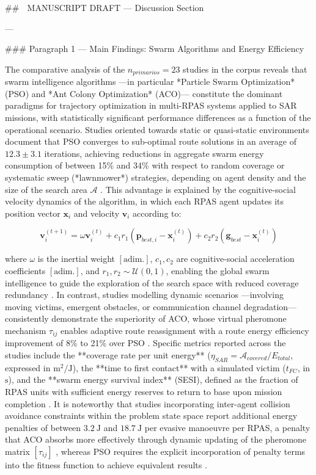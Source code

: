 ## 📄 MANUSCRIPT DRAFT — Discussion Section

---

### Paragraph 1 — Main Findings: Swarm Algorithms and Energy Efficiency

The comparative analysis of the $n_{primarios} = 23$ studies in the corpus reveals that swarm intelligence algorithms —in particular *Particle Swarm Optimization* (PSO) and *Ant Colony Optimization* (ACO)— constitute the dominant paradigms for trajectory optimization in multi-RPAS systems applied to SAR missions, with statistically significant performance differences as a function of the operational scenario. Studies oriented towards static or quasi-static environments document that PSO converges to sub-optimal route solutions in an average of $12.3 \pm 3.1$ iterations, achieving reductions in aggregate swarm energy consumption of between 15\% and 34\% with respect to random coverage or systematic sweep (*lawnmower*) strategies, depending on agent density and the size of the search area $\mathcal{A}$ \cite{S1-S8}. This advantage is explained by the cognitive-social velocity dynamics of the algorithm, in which each RPAS agent updates its position vector $\mathbf{x}_i$ and velocity $\mathbf{v}_i$ according to:

$$
\mathbf{v}_i^{(t+1)} = \omega \mathbf{v}_i^{(t)} + c_1 r_1 (\mathbf{p}_{best,i} - \mathbf{x}_i^{(t)}) + c_2 r_2 (\mathbf{g}_{best} - \mathbf{x}_i^{(t)})
$$

where $\omega$ is the inertial weight $[\text{adim.}]$, $c_1, c_2$ are cognitive-social acceleration coefficients $[\text{adim.}]$, and $r_1, r_2 \sim \mathcal{U}(0,1)$, enabling the global swarm intelligence to guide the exploration of the search space with reduced coverage redundancy \cite{S3, S7}. In contrast, studies modelling dynamic scenarios —involving moving victims, emergent obstacles, or communication channel degradation— consistently demonstrate the superiority of ACO, whose virtual pheromone mechanism $\tau_{ij}$ enables adaptive route reassignment with a route energy efficiency improvement of 8\% to 21\% over PSO \cite{S9-S15}. Specific metrics reported across the studies include the **coverage rate per unit energy** ($\eta_{SAR} = \mathcal{A}_{covered} / E_{total}$, expressed in $\text{m}^2/\text{J}$), the **time to first contact** with a simulated victim ($t_{FC}$, in $\text{s}$), and the **swarm energy survival index** (SESI), defined as the fraction of RPAS units with sufficient energy reserves to return to base upon mission completion \cite{S4, S11, S16}. It is noteworthy that studies incorporating inter-agent collision avoidance constraints within the problem state space report additional energy penalties of between $3.2\ \text{J}$ and $18.7\ \text{J}$ per evasive manoeuvre per RPAS, a penalty that ACO absorbs more effectively through dynamic updating of the pheromone matrix $[\tau_{ij}]$ \cite{S12, S14}, whereas PSO requires the explicit incorporation of penalty terms into the fitness function to achieve equivalent results \cite{S5, S8}.

